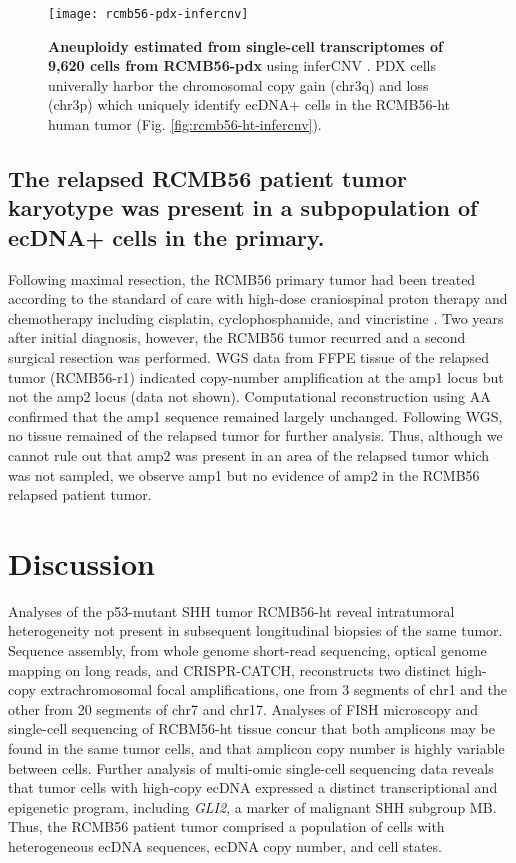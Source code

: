 \begin{figure}[!h]
    \centering
    \texttt{[image: rcmb56-pdx-infercnv]}
    \caption[Aneuploidy estimated from single-cell transcriptomes of 9,620 cells from RCMB56-pdx]{\textbf{Aneuploidy estimated from single-cell transcriptomes of 9,620 cells from RCMB56-pdx} using inferCNV \cite{inferCNV_2019}. PDX cells univerally harbor the chromosomal copy gain (chr3q) and loss (chr3p) which uniquely identify ecDNA+ cells in the RCMB56-ht human tumor (Fig. \ref{fig:rcmb56-ht-infercnv}).
    }
    \label{fig:rcmb56-pdx-infercnv}
\end{figure}

\subsection{The relapsed RCMB56 patient tumor karyotype was present in a subpopulation of ecDNA+ cells in the primary.}
Following maximal resection, the RCMB56 primary tumor had been treated according to the standard of care with high-dose craniospinal proton therapy and chemotherapy including cisplatin, cyclophosphamide, and vincristine \cite{rusert_2020}. Two years after initial diagnosis, however, the RCMB56 tumor recurred and a second surgical resection was performed. WGS data from \gls{FFPE} tissue of the relapsed tumor (RCMB56-r1) indicated copy-number amplification at the amp1 locus but not the amp2 locus (data not shown). Computational reconstruction using \gls{AA} confirmed that the amp1 sequence remained largely unchanged. Following WGS, no tissue remained of the relapsed tumor for further analysis. Thus, although we cannot rule out that amp2 was present in an area of the relapsed tumor which was not sampled, we observe amp1 but no evidence of amp2 in the RCMB56 relapsed patient tumor.

\section{Discussion}
Analyses of the p53-mutant SHH tumor RCMB56-ht reveal intratumoral heterogeneity not present in subsequent longitudinal biopsies of the same tumor. Sequence assembly, from whole genome short-read sequencing, optical genome mapping on long reads, and CRISPR-CATCH, reconstructs two distinct high-copy extrachromosomal focal amplifications, one from 3 segments of chr1 and the other from 20 segments of chr7 and chr17. Analyses of FISH microscopy and single-cell sequencing of RCBM56-ht tissue concur that both amplicons may be found in the same tumor cells, and that amplicon copy number is highly variable between cells. Further analysis of multi-omic single-cell sequencing data reveals that tumor cells with high-copy ecDNA expressed a distinct transcriptional and epigenetic program, including \textit{GLI2}, a marker of malignant SHH subgroup MB. Thus, the RCMB56 patient tumor comprised a population of cells with heterogeneous ecDNA sequences, ecDNA copy number, and cell states. 

